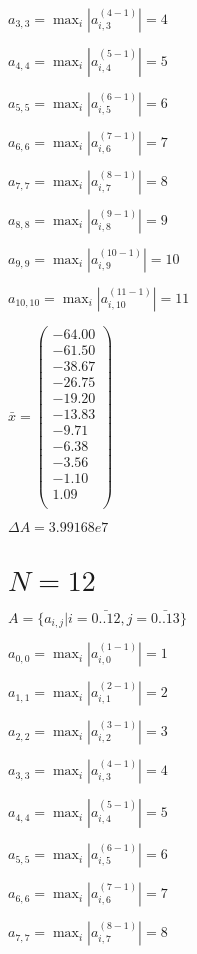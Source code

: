 \documentclass[a4paper,12pt]{article}
\begin{document}
$a _{ 3, 3 } =  \max _i |a _{ i, 3 } ^{ (4 - 1) } | = 4$

$a _{ 4, 4 } =  \max _i |a _{ i, 4 } ^{ (5 - 1) } | = 5$

$a _{ 5, 5 } =  \max _i |a _{ i, 5 } ^{ (6 - 1) } | = 6$

$a _{ 6, 6 } =  \max _i |a _{ i, 6 } ^{ (7 - 1) } | = 7$

$a _{ 7, 7 } =  \max _i |a _{ i, 7 } ^{ (8 - 1) } | = 8$

$a _{ 8, 8 } =  \max _i |a _{ i, 8 } ^{ (9 - 1) } | = 9$

$a _{ 9, 9 } =  \max _i |a _{ i, 9 } ^{ (10 - 1) } | = 10$

$a _{ 10, 10 } =  \max _i |a _{ i, 10 } ^{ (11 - 1) } | = 11$

$\bar { x } = \begin{pmatrix}
-64.00 \\
-61.50 \\
-38.67 \\
-26.75 \\
-19.20 \\
-13.83 \\
-9.71 \\
-6.38 \\
-3.56 \\
-1.10 \\
1.09 \\
\end{pmatrix}
$

$\Delta A = 3.99168e7$



\section{ $N = 12$ }
$A = \{ a _{ i, j } | i = \bar { 0..12 }, j = \bar { 0..13 } \}$

$a _{ 0, 0 } =  \max _i |a _{ i, 0 } ^{ (1 - 1) } | = 1$

$a _{ 1, 1 } =  \max _i |a _{ i, 1 } ^{ (2 - 1) } | = 2$

$a _{ 2, 2 } =  \max _i |a _{ i, 2 } ^{ (3 - 1) } | = 3$

$a _{ 3, 3 } =  \max _i |a _{ i, 3 } ^{ (4 - 1) } | = 4$

$a _{ 4, 4 } =  \max _i |a _{ i, 4 } ^{ (5 - 1) } | = 5$

$a _{ 5, 5 } =  \max _i |a _{ i, 5 } ^{ (6 - 1) } | = 6$

$a _{ 6, 6 } =  \max _i |a _{ i, 6 } ^{ (7 - 1) } | = 7$

$a _{ 7, 7 } =  \max _i |a _{ i, 7 } ^{ (8 - 1) } | = 8$
\end{document}
